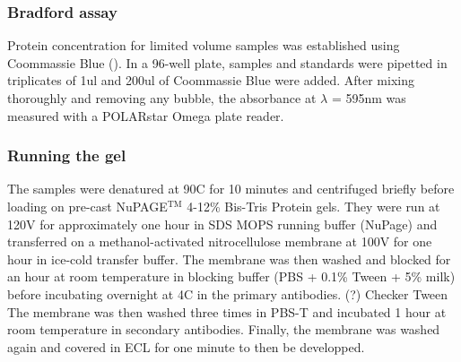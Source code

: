 \documentclass[onecolumn,10pt]{asme2ej}
\begin{document}
%



\subsubsection{Bradford assay}
Protein concentration for limited volume samples was established using Coommassie Blue (). In a 96-well plate, samples and standards were pipetted in triplicates of 1ul and 200ul of Coommassie Blue were added. After mixing thoroughly and removing any bubble, the absorbance at $\lambda$ = 595nm was measured with a POLARstar Omega plate reader.


\subsubsection{Running the gel}
The samples were denatured at 90C for 10 minutes and centrifuged briefly before loading on pre-cast NuPAGE$^{\text{TM}}$ 4-12\% Bis-Tris Protein gels. They were run at 120V for approximately one hour in SDS MOPS running buffer (NuPage) and transferred on a methanol-activated nitrocellulose membrane at 100V for one hour in ice-cold transfer buffer. The membrane was then washed and blocked for an hour at room temperature in blocking buffer (PBS + 0.1\% Tween + 5\% milk) before incubating overnight at 4C in the primary antibodies. 
(?) Checker Tween
The membrane was then washed three times in PBS-T and incubated 1 hour at room temperature in secondary antibodies. Finally, the membrane was washed again and covered in ECL for one minute to then be developped. 
\end{document}
